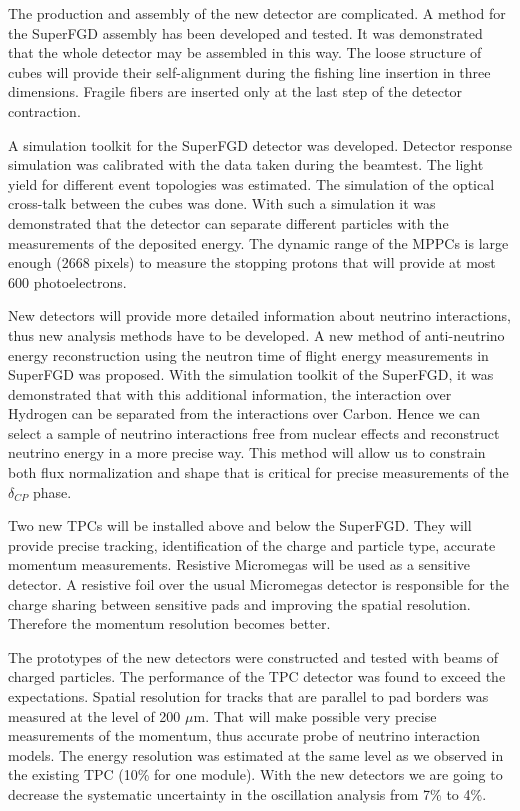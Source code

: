 \documentclass[./main.tex]{subfiles}
\begin{document}
The production and assembly of the new detector are complicated. A method for the SuperFGD assembly has been developed and tested. It was demonstrated that the whole detector may be assembled in this way. The loose structure of cubes will provide their self-alignment during the fishing line insertion in three dimensions. Fragile fibers are inserted only at the last step of the detector contraction.

A simulation toolkit for the SuperFGD detector was developed. Detector response simulation was calibrated with the data taken during the beamtest. The light yield for different event topologies was estimated. The simulation of the optical cross-talk between the cubes was done. With such a simulation it was demonstrated that the detector can separate different particles with the measurements of the deposited energy. The dynamic range of the MPPCs is large enough (2668 pixels) to measure the stopping protons that will provide at most 600 photoelectrons.

New detectors will provide more detailed information about neutrino interactions, thus new analysis methods have to be developed. A new method of anti-neutrino energy reconstruction using the neutron time of flight energy measurements in SuperFGD was proposed. With the simulation toolkit of the SuperFGD, it was demonstrated that with this additional information, the interaction over Hydrogen can be separated from the interactions over Carbon. Hence we can select a sample of neutrino interactions free from nuclear effects and reconstruct neutrino energy in a more precise way. This method will allow us to constrain both flux normalization and shape that is critical for precise measurements of the $\delta_{CP}$ phase.

Two new TPCs will be installed above and below the SuperFGD. They will provide precise tracking, identification of the charge and particle type, accurate momentum measurements. Resistive Micromegas will be used as a sensitive detector. A resistive foil over the usual Micromegas detector is responsible for the charge sharing between sensitive pads and improving the spatial resolution. Therefore the momentum resolution becomes better.

The prototypes of the new detectors were constructed and tested with beams of charged particles. The performance of the TPC detector was found to exceed the expectations. Spatial resolution for tracks that are parallel to pad borders was measured at the level of 200 $\mu$m. That will make possible very precise measurements of the momentum, thus accurate probe of neutrino interaction models. The energy resolution was estimated at the same level as we observed in the existing TPC (10\% for one module). With the new detectors we are going to decrease the systematic uncertainty in the oscillation analysis from 7\% to 4\%.
\end{document}
